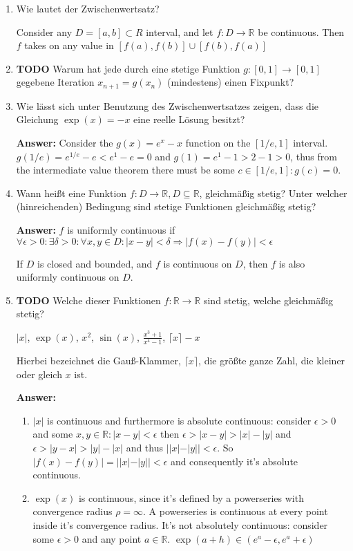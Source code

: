 \documentclass[11pt]{article}
\begin{document}
\begin{enumerate}
\item Wie lautet der Zwischenwertsatz?

Consider any $D = [a, b] \subset R$ interval, and let $f\colon D \to \mathbb{R}$ be continuous. Then $f$ takes on any value in $[f(a), f(b)] \cup [f(b), f(a)]$

\item \textbf{TODO} Warum hat jede durch eine stetige Funktion $g\colon [0,1] \to [0,1]$ gegebene Iteration $x_{n+1} = g(x_n)$ (mindestens) einen Fixpunkt?




\item Wie lässt sich unter Benutzung des Zwischenwertsatzes zeigen, dass die Gleichung $\exp(x) = -x$ eine reelle Lösung besitzt?

\textbf{Answer:} Consider the $g(x) = e^x - x$ function on the $[1/e, 1]$ interval. $g(1/e) = e^{1/e} - e < e^1 - e = 0$ and $g(1) = e^1 - 1 > 2 - 1 > 0$, thus from the intermediate value theorem there must be some $c \in [1/e, 1]\colon g(c) = 0$.

\item Wann heißt eine Funktion $f\colon D \to \mathbb{R}, D \subseteq \mathbb{R}$, gleichmäßig stetig? Unter welcher (hinreichenden) Bedingung sind stetige Funktionen gleichmäßig stetig?

\textbf{Answer:} $f$ is uniformly continuous if $\forall \epsilon > 0\colon \exists \delta > 0\colon \forall x, y \in D\colon | x - y| < \delta \Rightarrow |f(x) - f(y) | < \epsilon$

If $D$ is closed and bounded, and $f$ is continuous on $D$, then $f$ is also uniformly continuous on $D$.

\item \textbf{TODO}  Welche dieser Funktionen $f\colon \mathbb{R} \to \mathbb{R}$ sind stetig, welche gleichmäßig stetig?
 \begin{center}
    $|x|$,   $\operatorname{exp}(x)$, $x^2$, $\sin(x)$, $\frac{x^3+1}{x^4-1}$, $\lceil x \rceil - x$
\end{center}
Hierbei bezeichnet die Gauß-Klammer, $\lceil x \rceil$, die größte ganze Zahl, die kleiner oder gleich $x$ ist.

\textbf{Answer:} 
\begin{enumerate}
    \item $|x|$ is continuous and furthermore is absolute continuous: consider $\epsilon > 0$ and some $x, y \in \mathbb{R}\colon |x - y| < \epsilon$ then $\epsilon > |x - y| > |x| - |y|$ and $\epsilon > |y - x| > |y| - |x|$ and thus $||x| - |y|| < \epsilon$. So $|f(x) - f(y)| = ||x| - |y|| < \epsilon$ and consequently it's absolute continuous.
    \item $\operatorname{exp}(x)$ is continuous, since it's defined by a powerseries with convergence radius $\rho = \infty$. A powerseries is continuous at every point inside it's convergence radius. It's not absolutely continuous: consider some $\epsilon > 0$ and any point $a \in \mathbb{R}$. $\exp(a+h) \in (e^a-\epsilon, e^a + \epsilon)$
    

\end{enumerate}
\end{enumerate}
\end{document}
